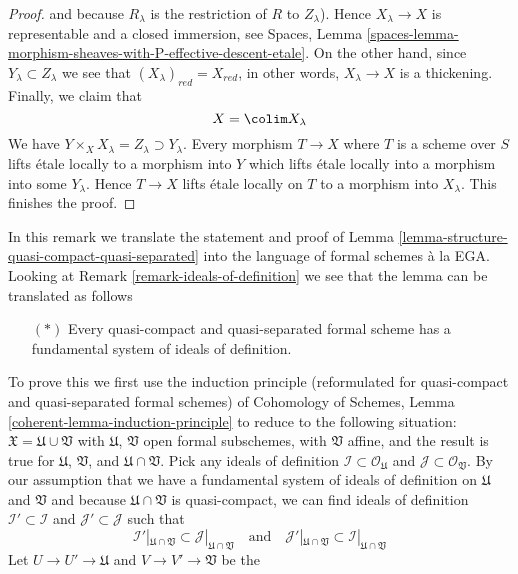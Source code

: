 \begin{proof}
and because $R_\lambda$ is the restriction of $R$ to $Z_\lambda$).
Hence $X_\lambda \to X$ is representable and a closed immersion, see
Spaces, Lemma
\ref{spaces-lemma-morphism-sheaves-with-P-effective-descent-etale}.
On the other hand, since $Y_\lambda \subset Z_\lambda$ we see that
$(X_\lambda)_{red} = X_{red}$, in other words, $X_\lambda \to X$
is a thickening. Finally, we claim that
$$
X = \colim X_\lambda
$$
We have $Y \times_X X_\lambda = Z_\lambda \supset Y_\lambda$. Every
morphism $T \to X$ where $T$ is a scheme over $S$ lifts \'etale locally
to a morphism into $Y$ which lifts \'etale locally into a morphism
into some $Y_\lambda$. Hence $T \to X$ lifts \'etale locally on
$T$ to a morphism into $X_\lambda$. This finishes the proof.
\end{proof}

\begin{remark}
\label{remark-structure-quasi-compact-quasi-separated}
In this remark we translate the statement and proof of
Lemma \ref{lemma-structure-quasi-compact-quasi-separated}
into the language of formal schemes \`a la EGA.
Looking at Remark \ref{remark-ideals-of-definition} we see
that the lemma can be translated as follows
\begin{itemize}
\item[$(*)$] Every quasi-compact and quasi-separated formal
scheme has a fundamental system of ideals of definition.
\end{itemize}
To prove this we first use the induction principle (reformulated for
quasi-compact and quasi-separated formal schemes) of
Cohomology of Schemes, Lemma \ref{coherent-lemma-induction-principle}
to reduce to the following situation:
$\mathfrak X = \mathfrak U \cup \mathfrak V$
with $\mathfrak U$, $\mathfrak V$ open formal subschemes,
with $\mathfrak V$ affine, and the result is true for $\mathfrak U$,
$\mathfrak V$, and $\mathfrak U \cap \mathfrak V$. Pick any ideals
of definition $\mathcal{I} \subset \mathcal{O}_\mathfrak U$
and $\mathcal{J} \subset \mathcal{O}_\mathfrak V$.
By our assumption that we have a fundamental system of ideals
of definition on $\mathfrak U$ and $\mathfrak V$ and because
$\mathfrak U \cap \mathfrak V$ is quasi-compact, we can find
ideals of definition $\mathcal{I}' \subset \mathcal{I}$
and $\mathcal{J}' \subset \mathcal{J}$
such that
$$
\mathcal{I}'|_{\mathfrak U \cap \mathfrak V} \subset
\mathcal{J}|_{\mathfrak U \cap \mathfrak V}
\quad\text{and}\quad
\mathcal{J}'|_{\mathfrak U \cap \mathfrak V} \subset
\mathcal{I}|_{\mathfrak U \cap \mathfrak V}
$$
Let $U \to U' \to \mathfrak U$ and $V \to V' \to \mathfrak V$ be the

\end{remark}
